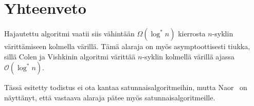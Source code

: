 \documentclass[finnish]{tktltiki2}
\theoremstyle{definition}
\theoremstyle{remark}
\begin{document}
\section{Yhteenveto}

Hajautettu algoritmi vaatii siis vähintään $\Omega(\log^* n)$ kierrosta
$n$-syklin vä\-rit\-tä\-mi\-seen kolmella värillä. Tämä alaraja on myös
asymptoottisesti tiukka, sillä Colen ja Vishkinin algoritmi värittää $n$-syklin
kolmellä värillä ajassa $\mathcal{O}(\log^* n)$.

Tässä esitetty todistus ei ota kantaa satunnaisalgoritmeihin, mutta
Naor~\cite{naor91} on näyttänyt, että vastaava alaraja pätee myös
satunnaisalgoritmeille.


%
%
% 
%



\end{document}
